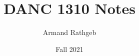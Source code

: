 \documentclass{article}
\title{DANC 1310 Notes}
\author{Armand Rathgeb}
\date{Fall 2021}
\begin{document}
  \maketitle
  \newpage
  \section{}
    
  \section{}
\end{document}
